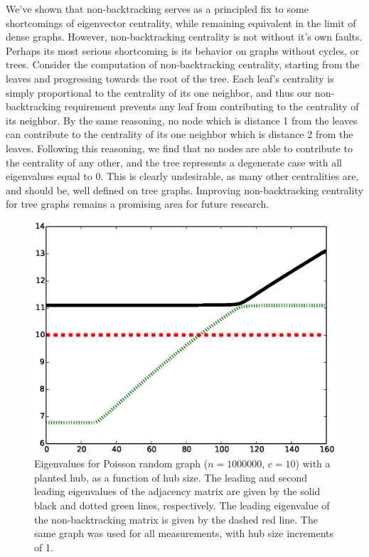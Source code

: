\documentclass[twocolumn,prl,superscriptaddress]{revtex4}
\begin{document}
We've shown that non-backtracking serves as a principled fix to some shortcomings of eigenvector centrality, while remaining equivalent in the limit of dense graphs. However, non-backtracking centrality is not without it's own faults. Perhaps its most serious shortcoming is its behavior on graphs without cycles, or trees. Consider the computation of non-backtracking centrality, starting from the leaves and progressing towards the root of the tree. Each leaf's centrality is simply proportional to the centrality of its one neighbor, and thus our non-backtracking requirement prevents any leaf from contributing to the centrality of its neighbor. By the same reasoning, no node which is distance 1 from the leaves can contribute to the centrality of its one neighbor which is distance 2 from the leaves. Following this reasoning, we find that no nodes are able to contribute to the centrality of any other, and the tree represents a degenerate case with all eigenvalues equal to 0. This is clearly undesirable, as many other centralities are, and should be, well defined on tree graphs. Improving non-backtracking centrality for tree graphs remains a promising area for future research.

\begin{figure}
\begin{center}
\includegraphics[width=\columnwidth]{eig.eps}
\end{center}
\caption{Eigenvalues for Poisson random graph ($n=1000000$, $c=10$) with a planted hub, as a function of hub size. The leading and second leading eigenvalues of the adjacency matrix are given by the solid black and dotted green lines, respectively. The leading eigenvalue of the non-backtracking matrix is given by the dashed red line. The same graph was used for all measurements, with hub size increments of 1.}
\label{fig:evalues}
\end{figure}
\end{document}
